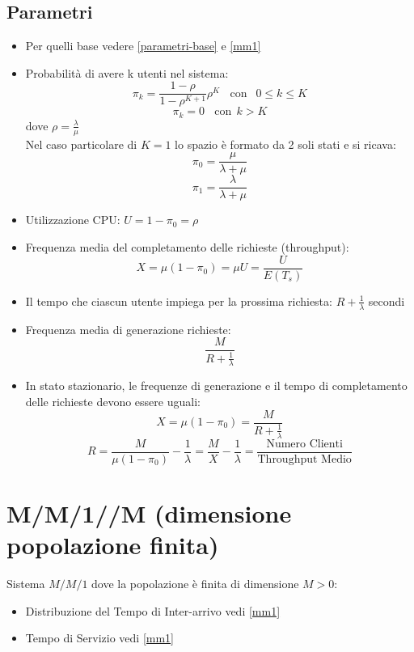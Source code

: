 \subsection{Parametri}

\begin{itemize}
    \item Per quelli base vedere \ref{parametri-base} e \ref{mm1}
    \item Probabilità di avere k utenti nel sistema:
          $$\pi_k = \frac{1-\rho}{1-\rho^{K+1}} \rho^K \ \ \ \ \text{con } \  \ 0 \leq k \leq K$$
          $$\pi_k = 0 \ \ \ \ \text{con} \ \ k > K$$
          dove $\rho = \frac{\lambda}{\mu}$\\

          Nel caso particolare di $K = 1$ lo spazio è formato da 2 soli stati e si ricava:
          $$\pi_0 = \frac{\mu}{\lambda + \mu}$$
          $$\pi_1 = \frac{\lambda}{\lambda + \mu}$$
    \item Utilizzazione CPU: $U = 1 - \pi_0 = \rho$
    \item Frequenza media del completamento delle richieste (throughput): $$X = \mu (1-\pi_0) = \mu U = \frac{U}{E(T_s)}$$
    \item Il tempo che ciascun utente impiega per la prossima richiesta: $R + \frac{1}{\lambda}$ secondi
    \item Frequenza media di generazione richieste: $$\frac{M}{R + \frac{1}{\lambda}}$$
    \item In stato stazionario, le frequenze di generazione e il tempo di completamento delle richieste devono essere uguali:
          $$X = \mu (1-\pi_0) = \frac{M}{R + \frac{1}{\lambda}}$$
          $$R = \frac{M}{\mu (1-\pi_0)} - \frac{1}{\lambda} = \frac{M}{X} - \frac{1}{\lambda} = \frac{\text{Numero Clienti}}{\text{Throughput Medio}}$$
\end{itemize}

\section{M/M/1//M (dimensione popolazione finita)}

Sistema $M/M/1$ dove la popolazione è finita di dimensione $M > 0$:

\begin{itemize}
    \item Distribuzione del Tempo di Inter-arrivo vedi \ref{mm1}
    \item Tempo di Servizio vedi \ref{mm1}
\end{itemize}


